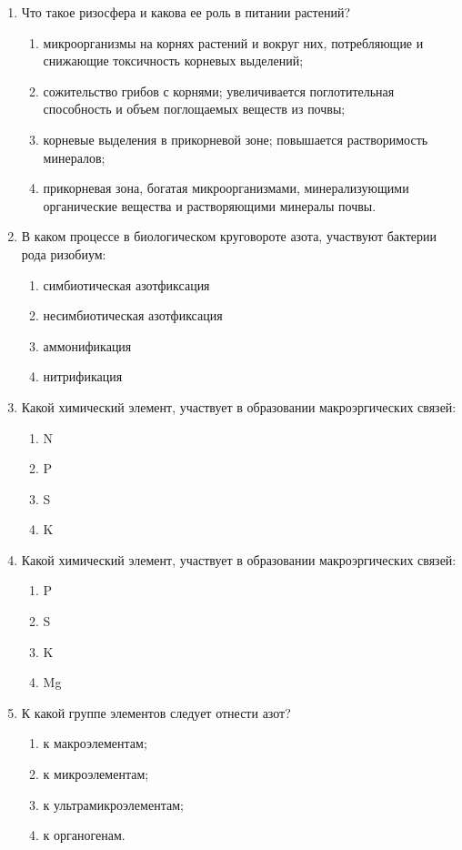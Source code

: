 \begin{enumerate}
\item Что такое ризосфера и какова ее роль в питании растений?
\begin{enumerate}
	\item микроорганизмы на корнях растений и вокруг них, потребляющие и снижающие токсичность корневых выделений; 
	\item сожительство грибов с корнями; увеличивается поглотительная способность и объем поглощаемых веществ из почвы; 
	\item корневые выделения в прикорневой зоне; повышается растворимость минералов; 
	\item прикорневая зона, богатая микроорганизмами, минерализующими органические вещества и растворяющими минералы почвы.
\end{enumerate}

\item В каком процессе в биологическом круговороте азота, участвуют бактерии рода ризобиум:
\begin{enumerate}
	\item симбиотическая азотфиксация      
	\item несимбиотическая азотфиксация
	\item аммонификация                               
	\item нитрификация
\end{enumerate}

\item Какой химический элемент, участвует в образовании макроэргических связей:
\begin{enumerate}
	\item N           
	\item P
	\item S            
	\item K
\end{enumerate}

\item Какой химический элемент, участвует в образовании макроэргических связей:
\begin{enumerate}
	\item P            
	\item S
	\item K           
	\item Mg
\end{enumerate}

\item К какой группе элементов следует отнести азот?
\begin{enumerate}
	\item к макроэлементам;              
	\item к микроэлементам; 
	\item к ультрамикроэлементам; 
	\item к органогенам.
\end{enumerate}


\end{enumerate}
